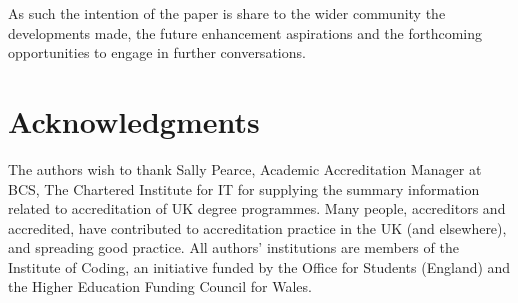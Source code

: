 \documentclass[sigconf]{acmart}
\begin{document}
As such the intention of the paper is share to the wider community the developments made, the future enhancement aspirations and the forthcoming opportunities to engage in further conversations.

\section{Acknowledgments}
The authors wish to thank Sally Pearce, Academic Accreditation Manager at BCS, The Chartered Institute for IT for supplying the summary information related to accreditation of UK degree programmes. Many people, accreditors and accredited, have contributed to accreditation practice in the UK (and elsewhere), and spreading good practice.  All authors' institutions are members of the Institute of Coding, an initiative funded by the Office for Students (England) and the Higher Education Funding Council for Wales.

%

\end{document}
